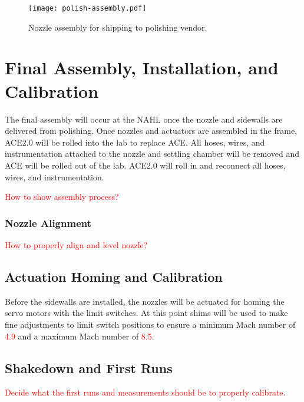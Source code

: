 \begin{figure}[ht!]
    \centering
    \texttt{[image: polish-assembly.pdf]}
    \caption{Nozzle assembly for shipping to polishing vendor.}
    \label{fig:polish-assembly}
\end{figure}

\section{Final Assembly, Installation, and Calibration}

The final assembly will occur at the NAHL once the nozzle and sidewalls are delivered from polishing. Once nozzles and actuators are assembled in the frame, ACE2.0 will be rolled into the lab to replace ACE. All hoses, wires, and instrumentation attached to the nozzle and settling chamber will be removed and ACE will be rolled out of the lab. ACE2.0 will roll in and reconnect all hoses, wires, and instrumentation.

\textcolor{red}{How to show assembly process?}

\subsubsection{Nozzle Alignment}

\textcolor{red}{How to properly align and level nozzle?}

\subsection{Actuation Homing and Calibration}

Before the sidewalls are installed, the nozzles will be actuated for homing the servo motors with the limit switches. At this point shims will be used to make fine adjustments to limit switch positions to ensure a minimum Mach number of \textcolor{red}{4.9} and a maximum Mach number of \textcolor{red}{8.5}.

\subsection{Shakedown and First Runs}

\textcolor{red}{Decide what the first runs and measurements should be to properly calibrate.}

